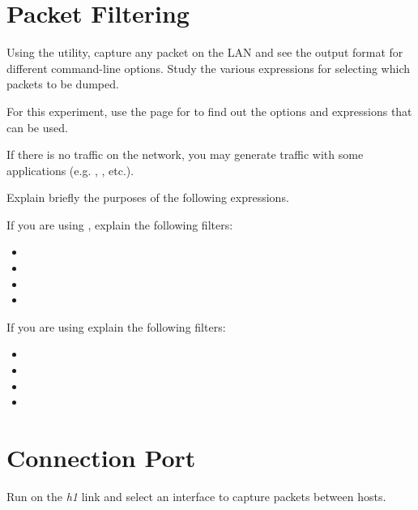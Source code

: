 \documentclass{../UTNetLab}
\begin{document}
\section{Packet Filtering}
Using the  utility, capture any packet on the LAN and see the output format
for different command-line options.
Study the various expressions for selecting
which packets to be dumped.

For this experiment, use the  page for  to find out the options and
expressions that can be used.

If there is no traffic on the network, you may generate traffic with some applications
(e.g. , , etc.).

\begin{report}
    \item Explain briefly the purposes of the following  expressions.
\end{report}

If you are using , explain the following filters:
\begin{itemize}
    \item {}
    \item {}
    \item {}
    \item {}
\end{itemize}

If you are using  explain the following filters:
\begin{itemize}
    \item {}
    \item {}
    \item {}
    \item {}
\end{itemize}

\section{Connection Port}
Run  on the \textit{h1} link and select an interface to capture packets between hosts.
\end{document}
